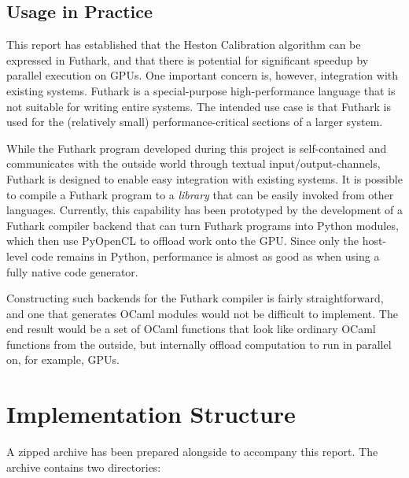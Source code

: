 \documentclass{article}
\begin{document}
\subsection{Usage in Practice}

This report has established that the Heston Calibration algorithm can
be expressed in Futhark, and that there is potential for significant
speedup by parallel execution on GPUs.  One important concern is,
however, integration with existing systems.  Futhark is a
special-purpose high-performance language that is not suitable for
writing entire systems.  The intended use case is that Futhark is used
for the (relatively small) performance-critical sections of a larger
system.

While the Futhark program developed during this project is
self-contained and communicates with the outside world through textual
input/output-channels, Futhark is designed to enable easy integration
with existing systems.  It is possible to compile a Futhark program to
a \textit{library} that can be easily invoked from other languages.
Currently, this capability has been prototyped by the development of a
Futhark compiler backend that can turn Futhark programs into Python
modules, which then use PyOpenCL to offload work onto the GPU.  Since
only the host-level code remains in Python, performance is almost as
good as when using a fully native code generator.

Constructing such backends for the Futhark compiler is fairly
straightforward, and one that generates OCaml modules would not be
difficult to implement.  The end result would be a set of OCaml
functions that look like ordinary OCaml functions from the outside,
but internally offload computation to run in parallel on, for example,
GPUs.




\appendix

\section{Implementation Structure}

A zipped archive has been prepared alongside to accompany this report.
The archive contains two directories:
\end{document}
